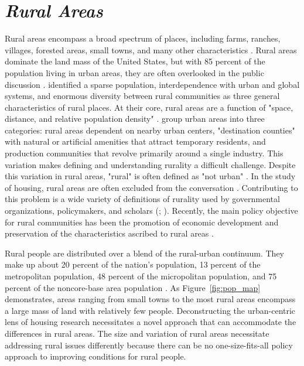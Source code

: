  

\section{\textit{Rural Areas}} 

Rural areas encompass a broad spectrum of places, including farms, ranches, villages, forested areas, small towns, and many other characteristics \citep{cromartie_defining_2008}. Rural areas dominate the land mass of the United States, but with 85 percent of the population living in urban areas, they are often overlooked in the public discussion \citep{pendall_future_2016}. \citet{castle_conceptual_1998} identified a sparse population, interdependence with urban and global systems, and enormous diversity between rural communities as three general characteristics of rural places. At their core, rural areas are a function of "space, distance, and relative population density" \citep{castle_place_2011}. \citet{shoup_principles_2010} group urban areas into three categories: rural areas dependent on nearby urban centers, "destination counties" with natural or artificial amenities that attract temporary residents, and production communities that revolve primarily around a single industry. This variation makes defining and understanding rurality a difficult challenge.  Despite this variation in rural areas, "rural" is often defined as "not urban" \citep{national_coalition_for_the_homeless_rural_2009}. In the study of housing, rural areas are often excluded from the conversation \citep{gkartzios_housing_2017}. Contributing to this problem is a wide variety of definitions of rurality used by governmental organizations, policymakers, and scholars (\citealp{cromartie_defining_2008}; \citealp{yousey_defining_2018}). Recently, the main policy objective for rural communities has been the promotion of economic development and preservation of the characteristics ascribed to rural areas \citep{lichter_changing_2007}.  

Rural people are distributed over a blend of the rural-urban continuum. They make up about 20 percent of the nation's population, 13 percent of the metropolitan population, 48 percent of the micropolitan population, and 75 percent of the noncore-base area population \citep{isserman_national_2005}. As Figure~\ref{fig:pop_map} demonstrates, areas ranging from small towns to the most rural areas encompass a large mass of land with relatively few people. Deconstructing the urban-centric lens of housing research necessitates a novel approach that can accommodate the differences in rural areas. The size and variation of rural areas necessitate addressing rural issues differently because there can be no one-size-fits-all policy approach to improving conditions for rural people.  

